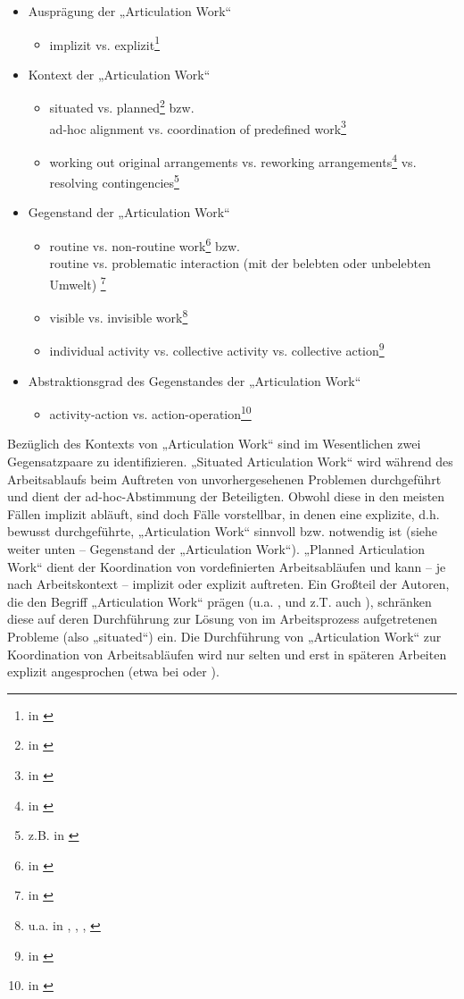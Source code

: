 \begin{itemize}
	\item Ausprägung der „Articulation Work“
	\begin{itemize}
		\item implizit vs. explizit\footnote{in \citep{Strauss93}}
	\end{itemize}
	\item Kontext der „Articulation Work“
	\begin{itemize}
		\item situated vs. planned\footnote{in \citep{Fjuk97}} bzw.\\
		 ad-hoc alignment vs. coordination of predefined work\footnote{in \citep{Schmidt00}}
		\item working out original arrangements vs. reworking arrangements\footnote{in \citep{Corbin93}} vs. resolving contingencies\footnote{z.B. in \citep{Gerson86}}
	\end{itemize}
	\item Gegenstand der „Articulation Work“
	\begin{itemize}
		\item routine vs. non-routine work\footnote{in \citep{Hampson05}} bzw.\\
		 routine vs. problematic interaction (mit der belebten oder unbelebten Umwelt) \footnote{in \citep{Strauss93}}
		\item visible vs. invisible work\footnote{u.a. in \citep{Suchman95}, \citep{Suchman99}, \citep{Star99}, \citep{Hampson05}}
		\item individual activity vs. collective activity vs. collective action\footnote{in \citep{Fjuk97}}
	\end{itemize}
	\item Abstraktionsgrad des Gegenstandes der „Articulation Work“
	\begin{itemize}
		\item activity-action vs. action-operation\footnote{in \citep{Fjuk97}}
	\end{itemize}
\end{itemize}

Bezüglich des Kontexts von „Articulation Work“ sind im Wesentlichen zwei Gegensatzpaare zu identifizieren. „Situated Articulation Work“ wird während des Arbeitsablaufs beim Auftreten von unvorhergesehenen Problemen durchgeführt und dient der ad-hoc-Abstimmung der Beteiligten. Obwohl diese in den meisten Fällen implizit abläuft, sind doch Fälle vorstellbar, in denen eine explizite, d.h. bewusst durchgeführte, „Articulation Work“ sinnvoll bzw. notwendig ist (siehe weiter unten -- Gegenstand der „Articulation Work“). „Planned Articulation Work“ dient der Koordination von vordefinierten Arbeitsabläufen und kann -- je nach Arbeitskontext -- implizit oder explizit auftreten. Ein Großteil der Autoren, die den Begriff „Articulation Work“ prägen (u.a. \citep{Strauss85}, \citep{Gerson86} und z.T. auch \citep{Schmidt92}), schränken diese auf deren Durchführung zur Lösung von im Arbeitsprozess aufgetretenen Probleme (also „situated“) ein. Die Durchführung von „Articulation Work“ zur Koordination von Arbeitsabläufen wird nur selten und erst in späteren Arbeiten explizit angesprochen (etwa bei \citep{Grinter96} oder \citep{Fjuk97}). 

